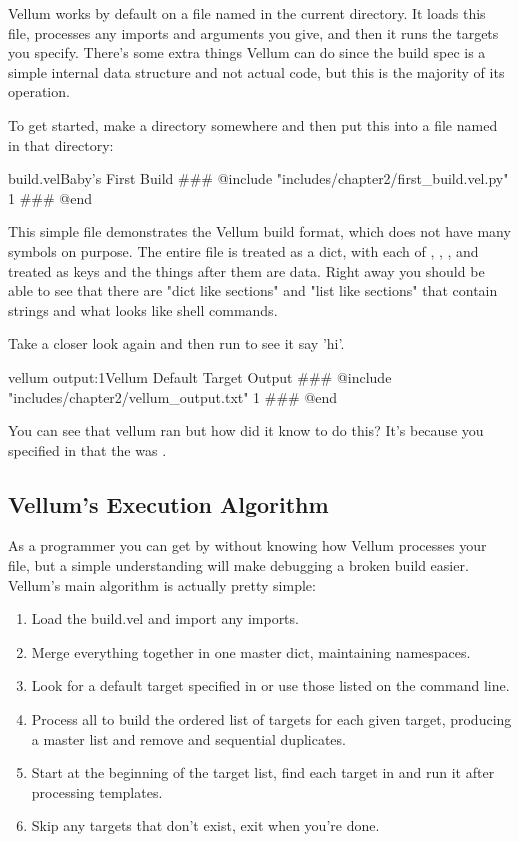 Vellum works by default on a file named  in the current
directory.  It loads this file, processes any imports and arguments you give,
and then it runs the targets you specify.  There's some extra things Vellum
can do since the build spec is a simple internal data structure and not
actual code, but this is the majority of its operation.

To get started, make a directory somewhere and then put this into a file named
 in that directory:

\begin{code}{build.vel}{Baby's First Build}
### @include "includes/chapter2/first_build.vel.py" 1
### @end
\end{code}

This simple file demonstrates the Vellum build format, which does not have many
symbols on purpose.  The entire file is treated as a dict, with each of
, , , and  treated
as keys and the things after them are data.  Right away you should be able to
see that there are "dict like sections" and "list like sections" that contain
strings and what looks like shell commands.

Take a closer look again and then run  to see it say 'hi'.

\begin{code}{vellum output:1}{Vellum Default Target Output}
### @include "includes/chapter2/vellum_output.txt" 1
### @end
\end{code}

You can see that vellum ran  but how did it know to do
this?  It's because you specified in  that the 
was .



\subsection{Vellum's Execution Algorithm}

As a programmer you can get by without knowing how Vellum processes your file,
but a simple understanding will make debugging a broken build easier.   Vellum's
main algorithm is actually pretty simple:

\begin{enumerate}
\item Load the build.vel and import any imports.
\item Merge everything together in one master dict, maintaining namespaces.
\item Look for a default target specified in  or use those listed
    on the command line.
\item Process all  to build the ordered list of targets for each
given target, producing a master list and remove and sequential duplicates.
\item Start at the beginning of the target list, find each target in
     and run it after processing templates.
\item Skip any targets that don't exist, exit when you're done.
\end{enumerate}

